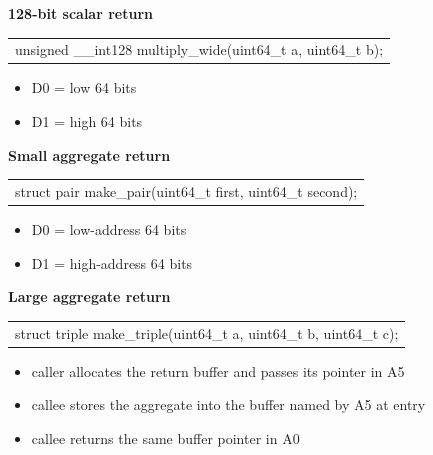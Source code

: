 \documentclass[10pt,twoside]{article}
\begin{document}
\noindent\textbf{128-bit scalar return}\par
\begingroup\small\ttfamily
\begin{tabularx}{\linewidth}{@{}X@{}}
unsigned \_\_int128 multiply\_wide(uint64\_t a, uint64\_t b);\tabularnewline
\end{tabularx}
\endgroup
\begin{itemize}
\item D0 = low 64 bits
\item D1 = high 64 bits
\end{itemize}
\Needspace{1.45in}
\noindent\textbf{Small aggregate return}\par
\begingroup\small\ttfamily
\begin{tabularx}{\linewidth}{@{}X@{}}
struct pair make\_pair(uint64\_t first, uint64\_t second);\tabularnewline
\end{tabularx}
\endgroup
\begin{itemize}
\item D0 = low-address 64 bits
\item D1 = high-address 64 bits
\end{itemize}
\Needspace{1.45in}
\noindent\textbf{Large aggregate return}\par
\begingroup\small\ttfamily
\begin{tabularx}{\linewidth}{@{}X@{}}
struct triple make\_triple(uint64\_t a, uint64\_t b, uint64\_t c);\tabularnewline
\end{tabularx}
\endgroup
\begin{itemize}
\item caller allocates the return buffer and passes its pointer in A5
\item callee stores the aggregate into the buffer named by A5 at entry
\item callee returns the same buffer pointer in A0
\end{itemize}
\end{document}
